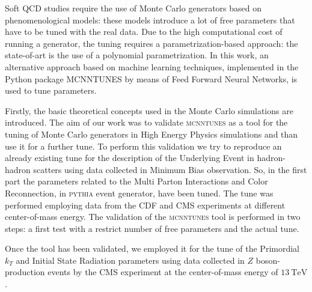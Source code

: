 Soft QCD studies require the use of Monte Carlo generators based on phenomenological models: these models introduce a lot of free parameters that have to be tuned with the real data.
Due to the high computational cost of running a generator, the tuning requires a parametrization-based approach: the state-of-art is the use of a polynomial parametrization. 
In this work, an alternative approach based on machine learning techniques, implemented in the Python package MCNNTUNES by means of Feed Forward Neural Networks, is used to tune parameters. 

\medskip

Firstly, the basic theoretical concepts used in the Monte Carlo simulations are introduced.
The aim of our work was to validate \textsc{mcnntunes} as a tool for the tuning of Monte Carlo generators in High Energy Physics simulations and than use it for a further tune.
To perform this validation we try to reproduce an already existing tune for the description of the Underlying Event in hadron-hadron scatters using data collected in Minimum Bias observation.
So, in the first part the parameters related to the Multi Parton Interactions and Color Reconnection, in \textsc{pythia} event generator, have been tuned. The tune was performed employing data from the CDF and CMS experiments at different center-of-mass energy. The validation of the \textsc{mcnntunes} tool is performed in two steps: a first test with a restrict number of free parameters and the actual tune. 

\medskip

Once the tool has been validated, we employed it for the tune of the Primordial $k_T$ and Initial State Radiation parameters using data collected in $Z$ boson-production events by the CMS experiment at the center-of-mass energy of $13\ \mathrm{TeV}$. 


%
